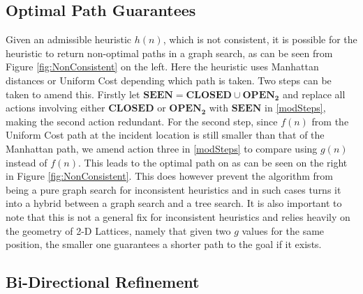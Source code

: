 \documentclass[conference]{IEEEtran}
\begin{document}
\subsection{Optimal Path Guarantees}
Given an admissible heuristic $h(n)$, which is not consistent, it is possible for the heuristic to return non-optimal paths in a graph search, as can be seen from Figure \ref{fig:NonConsistent} on the left. Here the heuristic uses Manhattan distances or Uniform Cost depending which path is taken. Two steps can be taken to amend this. Firstly let  $\mathbf{SEEN} =  \mathbf{CLOSED} \cup \mathbf{OPEN_2} $ and replace all actions involving either $\mathbf{CLOSED}$ or $\mathbf{OPEN_2}$ with $\mathbf{SEEN}$ in \ref{modSteps}, making the second action redundant. For the second step, since $f(n)$ from the Uniform Cost path at the incident location is still smaller than that of the Manhattan path, we amend action three in \ref{modSteps} to compare using $g(n)$ instead of $f(n)$. This leads to the optimal path on as can be seen on the right in Figure \ref{fig:NonConsistent}. This does however prevent the algorithm from being a pure graph search for inconsistent heuristics and in such cases turns it into a hybrid between a graph search and a tree search. It is also important to note that this is not a general fix for inconsistent heuristics and relies heavily on the geometry of 2-D Lattices, namely that given two $g$ values for the same position, the smaller one guarantees a shorter path to the goal if it exists.

\subsection{Bi-Directional Refinement}
\end{document}
